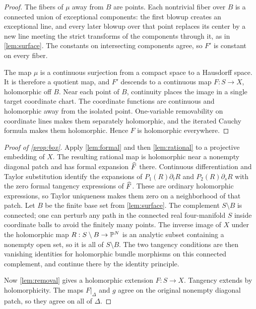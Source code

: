 \begin{proof}
The fibers of \(\mu\) away from \(B\) are points. Each nontrivial
fiber over \(B\) is a connected union of exceptional components:
the first blowup creates an exceptional line, and every later blowup
over that point replaces its center by a new line meeting the strict
transforms of the components through it, as in \cref{lem:surface}.
The constants on intersecting components agree,
so \(F'\) is constant on every fiber.

The map \(\mu\) is a continuous surjection from a compact space to
a Hausdorff space. It is therefore a quotient map, and \(F'\)
descends to a continuous map \(F:S\to X\), holomorphic off \(B\).
Near each point of \(B\), continuity places the image in a single
target coordinate chart. The coordinate functions are continuous
and holomorphic away from the isolated point. One-variable
removability on coordinate lines makes them separately
holomorphic, and the iterated Cauchy formula makes them
holomorphic. Hence \(F\) is holomorphic everywhere.
\end{proof}

\begin{proof}[Proof of \cref{prop:box}]
Apply \cref{lem:formal} and then \cref{lem:rational} to a projective
embedding of \(X\). The resulting rational map is holomorphic near
a nonempty diagonal patch and has formal expansion \(\widehat F\) there.
Continuous differentiation and Taylor substitution identify the
expansions of \(P_1(R)\partial_tR\) and \(P_2(R)\partial_sR\)
with the zero formal tangency expressions of \(\widehat F\). These are
ordinary holomorphic expressions, so Taylor uniqueness makes them
zero on a neighborhood of that patch. Let \(B\) be the finite base set from
\cref{lem:surface}. The complement \(S\setminus B\) is connected;
one can perturb any path in the connected real four-manifold \(S\)
inside coordinate balls to avoid the finitely many points.
The inverse image of \(X\) under the holomorphic map
\(R:S\setminus B\to\mathbb P^N\) is an analytic subset containing a
nonempty open set, so it is all of \(S\setminus B\). The two
tangency conditions are then vanishing identities for holomorphic
bundle morphisms on this connected complement, and continue there
by the identity principle.

Now \cref{lem:removal} gives a holomorphic extension \(F:S\to X\).
Tangency extends by holomorphicity. The maps \(F|_\Delta\) and
\(g\) agree on the original nonempty diagonal patch, so they
agree on all of \(\Delta\).
\end{proof}
